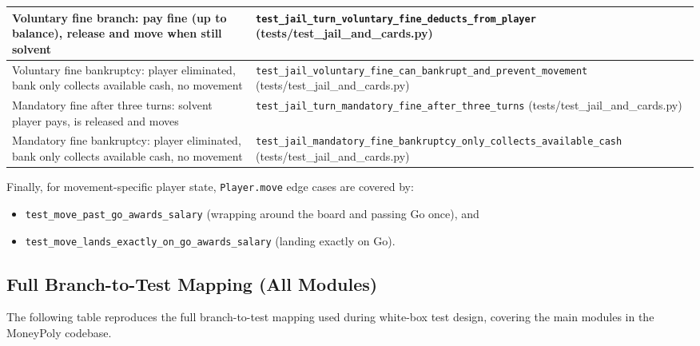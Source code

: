 \documentclass[11pt]{article}
\begin{document}
\begin{longtable}{>{\raggedright\arraybackslash}p{} >{\raggedright\arraybackslash}p{}}
Voluntary fine branch: pay fine (up to balance), release and move when still solvent & \texttt{test\_jail\_turn\_voluntary\_fine\_deducts\_from\_player} (tests/test\_jail\_and\_cards.py) \\ \hline
Voluntary fine bankruptcy: player eliminated, bank only collects available cash, no movement & \texttt{test\_jail\_voluntary\_fine\_can\_bankrupt\_and\_prevent\_movement} (tests/test\_jail\_and\_cards.py) \\ \hline
Mandatory fine after three turns: solvent player pays, is released and moves & \texttt{test\_jail\_turn\_mandatory\_fine\_after\_three\_turns} (tests/test\_jail\_and\_cards.py) \\ \hline
Mandatory fine bankruptcy: player eliminated, bank only collects available cash, no movement & \texttt{test\_jail\_mandatory\_fine\_bankruptcy\_only\_collects\_available\_cash} (tests/test\_jail\_and\_cards.py) \\ \hline
\end{longtable}

Finally, for movement-specific player state, \texttt{Player.move} edge cases are covered by:

\begin{itemize}
  \item \texttt{test\_move\_past\_go\_awards\_salary} (wrapping around the board and passing Go once), and
  \item \texttt{test\_move\_lands\_exactly\_on\_go\_awards\_salary} (landing exactly on Go).
\end{itemize}

\subsection*{Full Branch-to-Test Mapping (All Modules)}

The following table reproduces the full branch-to-test mapping used during white-box test design, covering the main modules in the MoneyPoly codebase.
\end{document}
